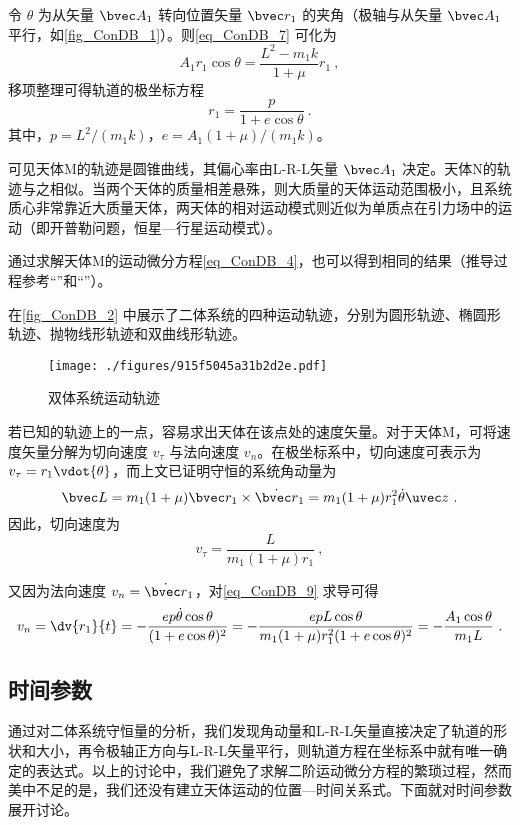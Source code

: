 令 $\theta$ 为从矢量 $\bvec A_1$ 转向位置矢量 $\bvec r_1$ 的夹角（极轴与从矢量 $\bvec A_1$ 平行，如\autoref{fig_ConDB_1}）。则\autoref{eq_ConDB_7} 可化为
\begin{equation}
A_1r_1\cos\theta = \frac{L^2-m_1k}{1+\mu}r_1~,
\end{equation}
移项整理可得轨道的极坐标方程
\begin{equation}\label{eq_ConDB_9}
r_1=\frac{p}{1+e \cos\theta}~.
\end{equation}
其中，$p=L^2/(m_1k)$，$e=A_1(1+\mu)/(m_1k)$。

可见天体M的轨迹是圆锥曲线，其偏心率由L-R-L矢量 $\bvec A_1$ 决定。天体N的轨迹与之相似。当两个天体的质量相差悬殊，则大质量的天体运动范围极小，且系统质心非常靠近大质量天体，两天体的相对运动模式则近似为单质点在引力场中的运动（即开普勒问题，恒星—行星运动模式）。

通过求解天体M的运动微分方程\autoref{eq_ConDB_4}，也可以得到相同的结果（推导过程参考“”和“”）。

在\autoref{fig_ConDB_2} 中展示了二体系统的四种运动轨迹，分别为圆形轨迹、椭圆形轨迹、抛物线形轨迹和双曲线形轨迹。
\begin{figure}[ht]
\centering
\texttt{[image: ./figures/915f5045a31b2d2e.pdf]}
\caption{双体系统运动轨迹} \label{fig_ConDB_2}
\end{figure}

若已知的轨迹上的一点，容易求出天体在该点处的速度矢量。对于天体M，可将速度矢量分解为切向速度 $v_\tau$ 与法向速度 $v_n$。在极坐标系中，切向速度可表示为 $v_\tau =r_1\vdot{\theta}$，而上文已证明守恒的系统角动量为
\begin{equation}\label{eq_ConDB_10}
\bvec L  = m_1(1+\mu)\bvec r_1 \times \dot{\bvec r}_1= m_1(1+\mu)r_1^2\dot{\theta}\uvec z~.
\end{equation}
因此，切向速度为
\begin{equation}
v_\tau =\frac{L}{m_1(1+\mu)r_1}~,
\end{equation}

又因为法向速度 $v_n=\dot{\bvec r}_1$，对\autoref{eq_ConDB_9} 求导可得
\begin{equation}
v_n =\dv{r_1}{t}=-\frac{ep\dot{\theta}\cos\theta}{(1+e\cos\theta)^2}=-\frac{epL\cos\theta}{m_1(1+\mu)r_1^2(1+e\cos\theta)^2}=-\frac{A_1\cos\theta}{m_1L}~.
\end{equation}

\subsection{时间参数}
通过对二体系统守恒量的分析，我们发现角动量和L-R-L矢量直接决定了轨道的形状和大小，再令极轴正方向与L-R-L矢量平行，则轨道方程在坐标系中就有唯一确定的表达式。以上的讨论中，我们避免了求解二阶运动微分方程的繁琐过程，然而美中不足的是，我们还没有建立天体运动的位置—时间关系式。下面就对时间参数展开讨论。

